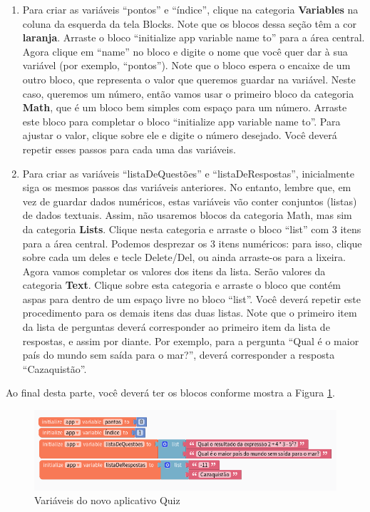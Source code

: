 \documentclass[11pt,fleqn]{book} %
\begin{document}
\begin{enumerate}
    \item Para criar as variáveis ``pontos'' e ``índice'', clique na categoria \textbf{Variables} na coluna da esquerda da tela Blocks. Note que os blocos dessa seção têm a cor \textbf{laranja}. Arraste o bloco ``initialize app variable name to'' para a área central. Agora clique em ``name'' no bloco e digite o nome que você quer dar à sua variável (por exemplo, ``pontos''). Note que o bloco espera o encaixe de um outro bloco, que representa o valor que queremos guardar na variável. Neste caso, queremos um número, então vamos usar o primeiro bloco da categoria \textbf{Math}, que é um bloco bem simples com espaço para um número. Arraste este bloco para completar o bloco ``initialize app variable name to''. Para ajustar o valor, clique sobre ele e digite o número desejado. Você deverá repetir esses passos para cada uma das variáveis.
    \item Para criar as variáveis ``listaDeQuestões'' e ``listaDeRespostas'', inicialmente siga os mesmos passos das variáveis anteriores. No entanto, lembre que, em vez de guardar dados numéricos, estas variáveis vão conter conjuntos (listas) de dados textuais. Assim, não usaremos blocos da categoria Math, mas sim da categoria \textbf{Lists}. Clique nesta categoria e arraste o bloco ``list'' com 3 itens para a área central. Podemos desprezar os 3 itens numéricos: para isso, clique sobre cada um deles e tecle Delete/Del, ou ainda arraste-os para a lixeira. Agora vamos completar os valores dos itens da lista. Serão valores da categoria \textbf{Text}. Clique sobre esta categoria e arraste o bloco que contém aspas para dentro de um espaço livre no bloco ``list''. Você deverá repetir este procedimento para os demais itens das duas listas. Note que o primeiro item da lista de perguntas deverá corresponder ao primeiro item da lista de respostas, e assim por diante. Por exemplo, para a pergunta ``Qual é o maior país do mundo sem saída para o mar?'', deverá corresponder a resposta ``Cazaquistão''.
\end{enumerate}

Ao final desta parte, você deverá ter os blocos conforme mostra a Figura \ref{fig:extraquizvars}.


\begin{figure}[H]
	\centering
    \includegraphics[width=\textwidth]{Pictures/GuiaThunkExtraQuizVars.png}
    \caption{Variáveis do novo aplicativo Quiz}\label{fig:extraquizvars}
\end{figure}
\end{document}
